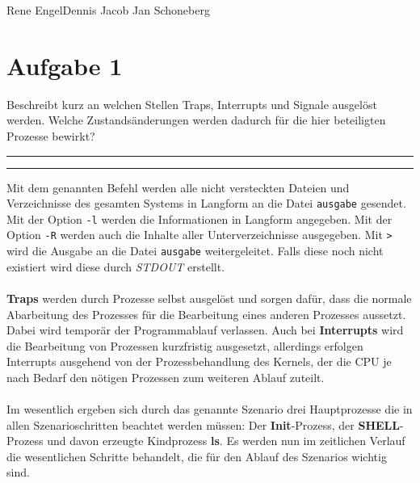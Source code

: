\documentclass{ti2}
\makeatletter
\renewenvironment{quote}{%
  \vskip 10\p@
  \parindent\z@
  \tcolorbox[
    breakable, sharp corners,
    boxrule=\z@, boxsep=\z@,
    left=\z@, right=\z@,
    top=\z@, bottom=\z@,
    colback=sx-yellow
  ]
  {\color{sx-orange}\d@ublerule}
  \vskip 5\p@
  \list{}{\rightmargin\leftmargin}%
  \item\relax
}{%
  \endlist
  {\color{sx-orange}\d@ublerule}
  \endtcolorbox
  \vskip 5\p@
}
\def\d@ublerule{\hrule\@width\hsize\kern 1.5\p@\hrule\@width\hsize}
\makeatother
\begin{document}
%
                {Rene Engel}{Dennis Jacob}%
                {Jan Schoneberg}%
                


\section*{Aufgabe 1}
\begin{quote}
	Beschreibt kurz an welchen Stellen Traps, Interrupts und Signale ausgelöst werden. Welche Zustandsänderungen werden dadurch für die hier beteiligten Prozesse bewirkt?
\end{quote}
Mit dem genannten Befehl werden alle nicht versteckten Dateien und Verzeichnisse des gesamten Systems in Langform an die Datei \texttt{ausgabe} gesendet. Mit der Option \texttt{-l} werden die Informationen in Langform angegeben. Mit der Option \texttt{-R} werden auch die Inhalte aller Unterverzeichnisse ausgegeben. Mit \texttt{>} wird die Ausgabe an die Datei \texttt{ausgabe} weitergeleitet. Falls diese noch nicht existiert wird diese durch \textit{STDOUT} erstellt.\\ \\
\textbf{Traps} werden durch Prozesse selbst ausgelöst und sorgen dafür, dass die normale Abarbeitung des Prozesses für die Bearbeitung eines anderen Prozesses aussetzt. Dabei wird temporär der Programmablauf verlassen. Auch bei \textbf{Interrupts} wird die Bearbeitung von Prozessen kurzfristig ausgesetzt, allerdings erfolgen Interrupts ausgehend von der Prozessbehandlung des Kernels, der die CPU je nach Bedarf den nötigen Prozessen zum weiteren Ablauf zuteilt.\\ \\
Im wesentlich ergeben sich durch das genannte Szenario drei Hauptprozesse die in allen Szenarioschritten beachtet werden müssen: Der \textbf{Init}-Prozess, der \textbf{SHELL}-Prozess und davon erzeugte Kindprozess \textbf{ls}. Es werden nun im zeitlichen Verlauf die wesentlichen Schritte behandelt, die für den Ablauf des Szenarios wichtig sind.
\end{document}
